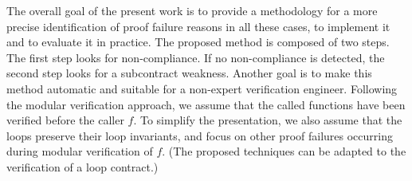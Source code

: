 \documentclass[web]{frama-c-book}
\begin{document}
The overall goal of the present work is to provide a methodology for a more
precise  identification of proof failure reasons in all these cases, to
implement it and to evaluate it in practice.
The proposed method is composed of two steps. The first step looks for
non-compliance. If no non-compliance is detected, the second step looks for a
subcontract weakness.
Another goal is to make this method automatic and suitable for a non-expert verification
engineer.
Following the modular verification approach,
we assume that the called functions have been verified before the caller $f$.
To simplify the presentation, we also assume that 
the loops preserve their loop invariants, and focus
on other proof failures occurring during modular verification of $f$. 
(The proposed techniques can be adapted to the verification of a loop contract.)




\appendix



\cleardoublepage
{}
{}




\cleardoublepage
{}
{}
\listoffigures


\cleardoublepage
{}
{}
\printindex
\end{document}
